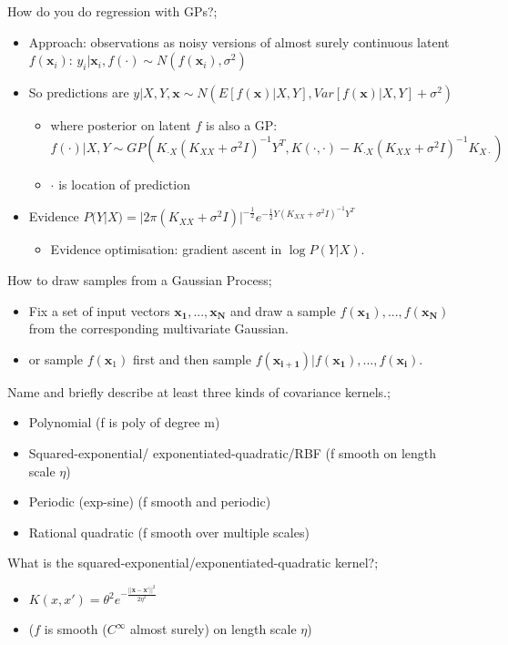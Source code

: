 \documentclass{article}
\begin{document}
How do you do regression with GPs?; \begin{itemize} \item Approach: observations as noisy versions of almost surely continuous latent $f(\mathbf{x}_i)$: $y_i|\mathbf{x}_i, f(\cdot)\sim N(f(\mathbf{x}_i), \sigma^2)$ \item So predictions are $y|X, Y, \mathbf{x}\sim N(E[f(\mathbf{x})|X, Y], Var[f(\mathbf{x})|X, Y]+\sigma^2)$ \begin{itemize} \item where posterior on latent $f$ is also a GP: $f(\cdot)|X,Y\sim GP(K_{\cdot X}(K_{XX}+\sigma^2I)^{-1}Y^T, K(\cdot, \cdot)-K_{\cdot X}(K_{XX}+\sigma^2I)^{-1}K_{X\cdot})$ \item $\cdot$ is location of prediction \end{itemize} \item Evidence $P(Y|X)=|2\pi(K_{XX}+\sigma^2I)|^{-\frac{1}{2}}e^{-\frac{1}{2}Y(K_{XX}+\sigma^2I)^{-1}Y^T}$ \begin{itemize} \item Evidence optimisation: gradient ascent in $\log P(Y|X)$.  \end{itemize} \end{itemize}

How to draw samples from a Gaussian Process; \begin{itemize} \item Fix a set of input vectors $\mathbf{x_1, ..., x_N}$ and draw a sample $f(\mathbf{x_1}),...,f(\mathbf{x_N})$ from the corresponding multivariate Gaussian.  \item or sample $f(\mathbf{x}_1)$ first and then sample $f(\mathbf{x_{i+1}})|f(\mathbf{x_1}),...,f(\mathbf{x_i})$.  \end{itemize}

Name and briefly describe at least three kinds of covariance kernels.; \begin{itemize} \item Polynomial (f is poly of degree m) \item Squared-exponential/ exponentiated-quadratic/RBF (f smooth on length scale $\eta$) \item Periodic (exp-sine) (f smooth and periodic) \item Rational quadratic (f smooth over multiple scales) \end{itemize}

What is the squared-exponential/exponentiated-quadratic kernel?; \begin{itemize} \item $K(x, x')=\theta^2e^{-\frac{||\mathbf{x}-\mathbf{x'}||^2}{2\eta^2}}$ \item ($f$ is smooth ($C^\infty$ almost surely) on length scale $\eta$) \end{itemize} 
\end{document}
